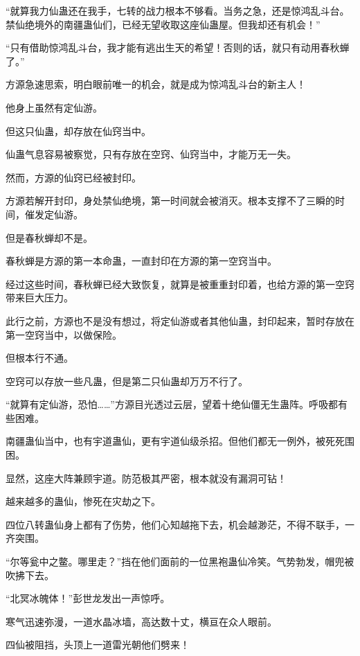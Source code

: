 
\begin{this_body}



“就算我力仙蛊还在我手，七转的战力根本不够看。当务之急，还是惊鸿乱斗台。禁仙绝境外的南疆蛊仙们，已经无望收取这座仙蛊屋。但我却还有机会！”

“只有借助惊鸿乱斗台，我才能有逃出生天的希望！否则的话，就只有动用春秋蝉了。”

方源急速思索，明白眼前唯一的机会，就是成为惊鸿乱斗台的新主人！

他身上虽然有定仙游。

但这只仙蛊，却存放在仙窍当中。

仙蛊气息容易被察觉，只有存放在空窍、仙窍当中，才能万无一失。

然而，方源的仙窍已经被封印。

方源若解开封印，身处禁仙绝境，第一时间就会被消灭。根本支撑不了三瞬的时间，催发定仙游。

但是春秋蝉却不是。

春秋蝉是方源的第一本命蛊，一直封印在方源的第一空窍当中。

经过这些时间，春秋蝉已经大致恢复，就算是被重重封印着，也给方源的第一空窍带来巨大压力。

此行之前，方源也不是没有想过，将定仙游或者其他仙蛊，封印起来，暂时存放在第一空窍当中，以做保险。

但根本行不通。

空窍可以存放一些凡蛊，但是第二只仙蛊却万万不行了。

“就算有定仙游，恐怕……”方源目光透过云层，望着十绝仙僵无生蛊阵。呼吸都有些困难。

南疆蛊仙当中，也有宇道蛊仙，更有宇道仙级杀招。但他们都无一例外，被死死围困。

显然，这座大阵兼顾宇道。防范极其严密，根本就没有漏洞可钻！

越来越多的蛊仙，惨死在灾劫之下。

四位八转蛊仙身上都有了伤势，他们心知越拖下去，机会越渺茫，不得不联手，一齐突围。

“尔等瓮中之鳖。哪里走？”挡在他们面前的一位黑袍蛊仙冷笑。气势勃发，帽兜被吹拂下去。

“北冥冰魄体！”彭世龙发出一声惊呼。

寒气迅速弥漫，一道水晶冰墙，高达数十丈，横亘在众人眼前。

四仙被阻挡，头顶上一道雷光朝他们劈来！


\end{this_body}
